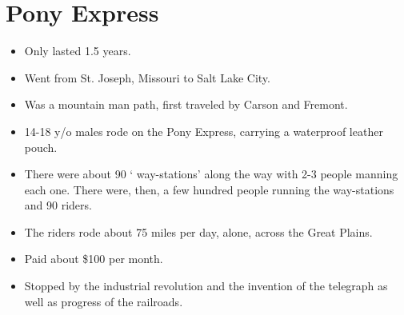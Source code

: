 \documentclass{article}
\begin{document}
\section{Pony Express}
  \begin{itemize}
    \item Only lasted 1.5 years.
    \item Went from St. Joseph, Missouri to Salt Lake City. 
    \item Was a mountain man path, first traveled by Carson and Fremont.
    \item 14-18 y/o males rode on the Pony Express, carrying a waterproof leather pouch.
    \item There were about 90 ` way-stations' along the way with 2-3 people manning each one. There were, then, a few hundred people running the way-stations and 90 riders.
    \item The riders rode about 75 miles per day, alone, across the Great Plains.
    \item Paid about \$100 per month.
    \item Stopped by the industrial revolution and the invention of the telegraph as well as progress of the railroads.
  \end{itemize}
\end{document}
